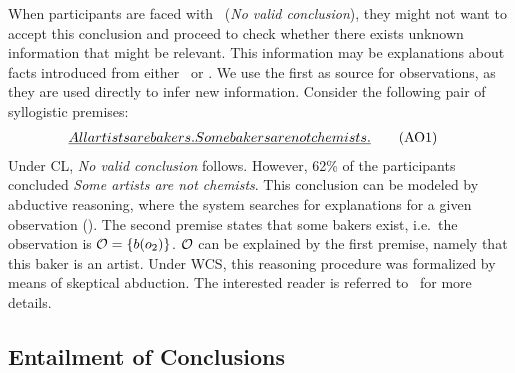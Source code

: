 \documentclass[12pt]{article}
\begin{document}
When participants are faced with \NVC\ (\textit{No valid conclusion}), they might not want to accept this conclusion and proceed to check whether there exists unknown information that might be relevant. This information may be explanations about
facts introduced from either \ or \unknownGen. 
We use the first as source for observations, as they are used directly to infer new information. Consider the following pair of syllogistic premises: 
\begin{align}
 \emph{All artists are bakers. } & \emph{Some bakers are not chemists.} \tag{AO1} 
\end{align}
Under CL, \textit{No valid conclusion} follows. However, 62\;\% of the participants concluded \textit{Some artists are not chemists}.
This conclusion can be modeled by abductive reasoning, where the system searches for explanations
for a given observation (\abduction). The second premise states that some bakers exist, i.e.\ the observation is ${\cal O} = \{b(o_2) \}$. ${\cal O}$ can be explained by the first premise, namely that
this baker is an artist. Under WCS, this reasoning procedure was formalized by means of skeptical abduction.
The interested reader is referred to~\cite{cogsci:2017} for more details.


\subsection{Entailment of Conclusions}\label{sect:entail}
\end{document}
